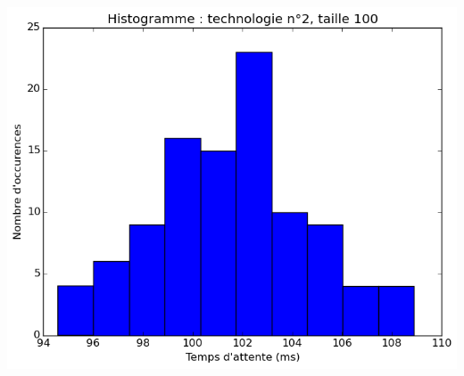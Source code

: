 \documentclass[a4paper,10pt]{article}
\begin{document}
\includegraphics[scale=0.4]{img/2-100.png}
\\
\end{document}
